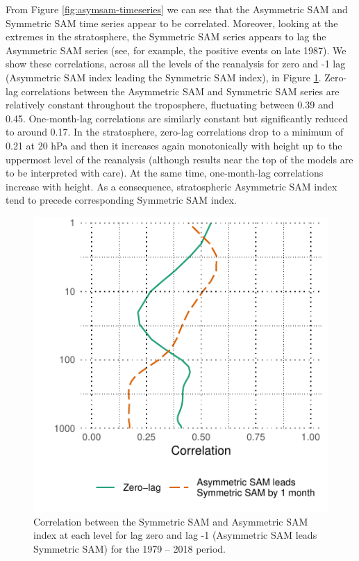 \documentclass[]{ametsocV5}
\begin{document}
From Figure \ref{fig:asymsam-timeseries} we can see that the Asymmetric SAM and Symmetric SAM time series appear to be correlated. Moreover, looking at the extremes in the stratosphere, the Symmetric SAM series appears to lag the Asymmetric SAM series (see, for example, the positive events on late 1987). We show these correlations, across all the levels of the reanalysis for zero and -1 lag (Asymmetric SAM index leading the Symmetric SAM index), in Figure \ref{fig:cor-lev}. Zero-lag correlations between the Asymmetric SAM and Symmetric SAM series are relatively constant throughout the troposphere, fluctuating between 0.39 and 0.45. One-month-lag correlations are similarly constant but significantly reduced to around 0.17. In the stratosphere, zero-lag correlations drop to a minimum of 0.21 at 20 hPa and then it increases again monotonically with height up to the uppermost level of the reanalysis (although results near the top of the models are to be interpreted with care). At the same time, one-month-lag correlations increase with height. As a consequence, stratospheric Asymmetric SAM index tend to precede corresponding Symmetric SAM index.

\begin{figure}
\includegraphics{cor-lev-1} \caption[Correlation between the Symmetric SAM and Asymmetric SAM index at each level for lag zero and lag -1 (Asymmetric SAM leads Symmetric SAM) for the 1979 -- 2018 period]{Correlation between the Symmetric SAM and Asymmetric SAM index at each level for lag zero and lag -1 (Asymmetric SAM leads Symmetric SAM) for the 1979 -- 2018 period.}\label{fig:cor-lev}
\end{figure}
\end{document}
